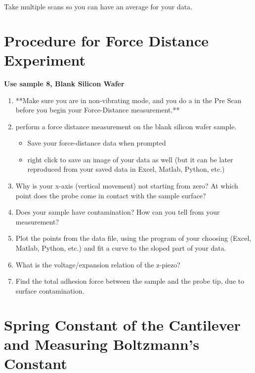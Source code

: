 \documentclass{../lab}
\begin{document}
Take multiple scans so you can have an average for your data.\section{Procedure for Force Distance Experiment}

\textbf{Use sample 8, Blank Silicon Wafer}

\begin{enumerate}
    \item **Make sure you are in non-vibrating mode, and you do a  in the Pre Scan before you begin your Force-Distance measurement.**

    \item perform a force distance measurement on the blank silicon wafer sample.

    \begin{itemize}
        \item Save your force-distance data when prompted

        \item right click to save an image of your data as well (but it can be later reproduced from your saved data in Excel, Matlab, Python, etc.)

    \end{itemize}

    \item Why is your x-axis (vertical movement) not starting from zero?  At which point does the probe come in contact with the sample surface?

    \item Does your sample have contamination? How can you tell from your measurement?

    \item Plot the points from the data file, using the program of your choosing (Excel, Matlab, Python, etc.) and fit a curve to the sloped part of your data.

    \item What is the voltage/expansion relation of the z-piezo?

    \item Find the total adhesion force between the sample and the probe tip, due to surface contamination.

\end{enumerate}

\section{Spring Constant of the Cantilever and Measuring Boltzmann's Constant}
\end{document}
